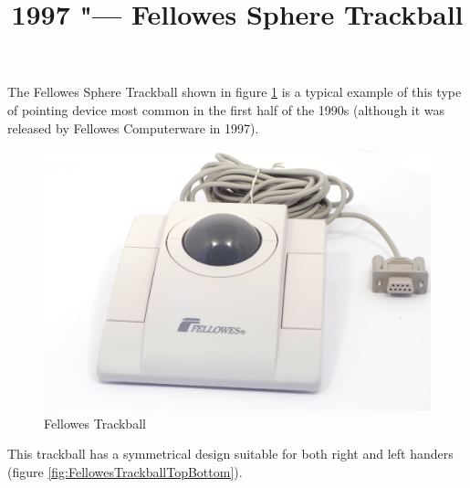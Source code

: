 \documentclass[11pt, a4paper]{article}
\begin{document}
\title{1997 "--- Fellowes Sphere Trackball}
\date{}
\maketitle
{}
The Fellowes Sphere Trackball shown in figure \ref{fig:FellowesTrackballPic} is a typical example of this type of pointing device most common in the first half of the 1990s (although it was released by Fellowes Computerware in 1997).

\begin{figure}[h]
    \centering
    \includegraphics[scale=0.5]{1997_fellowes_trackball/pic_30.jpg}
    \caption{Fellowes Trackball}
    \label{fig:FellowesTrackballPic}
\end{figure}

This trackball has a symmetrical design suitable for both right and left handers (figure \ref{fig:FellowesTrackballTopBottom}).
\end{document}
